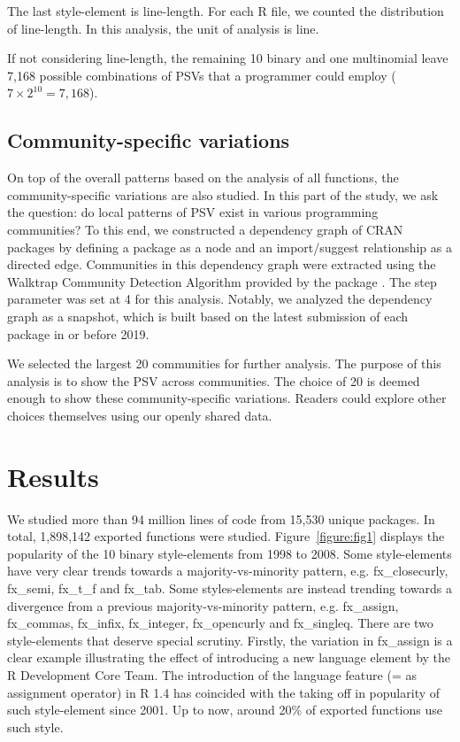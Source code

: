 The last style-element is line-length. For each R file, we counted the distribution of line-length. In this analysis, the unit of analysis is line.

If not considering line-length, the remaining 10 binary and one multinomial leave 7,168 possible combinations of PSVs that a programmer could employ ($7 \times 2^{10} = 7,168$).

\subsection{Community-specific variations}

On top of the overall patterns based on the analysis of all functions, the community-specific variations are also studied. In this part of the study, we ask the question: do local patterns of PSV exist in various programming communities? To this end, we constructed a dependency graph of CRAN packages by defining a package as a node and an import/suggest relationship as a directed edge. Communities in this dependency graph were extracted using the Walktrap Community Detection Algorithm \citep{pons} provided by the  package \citep{csardi}. The step parameter was set at 4 for this analysis. Notably, we analyzed the dependency graph as a snapshot, which is built based on the latest submission of each package in or before 2019.

We selected the largest 20 communities for further analysis. The purpose of this analysis is to show the PSV across communities. The choice of 20 is deemed enough to show these community-specific variations. Readers could explore other choices themselves using our openly shared data.

\section{Results}

We studied more than 94 million lines of code from 15,530 unique packages. In total, 1,898,142 exported functions were studied. Figure~\ref{figure:fig1} displays the popularity of the 10 binary style-elements from 1998 to 2008. Some style-elements have very clear trends towards a majority-vs-minority pattern, e.g. fx\_closecurly, fx\_semi, fx\_t\_f and fx\_tab. Some styles-elements are instead trending towards a divergence from a previous majority-vs-minority pattern, e.g. fx\_assign, fx\_commas, fx\_infix, fx\_integer, fx\_opencurly and fx\_singleq. There are two style-elements that deserve special scrutiny. Firstly, the variation in fx\_assign is a clear example illustrating the effect of introducing a new language element by the R Development Core Team. The introduction of the language feature (= as assignment operator) in R 1.4 \citep{chambers} has coincided with the taking off in popularity of such style-element since 2001. Up to now, around 20\% of exported functions use such style.

